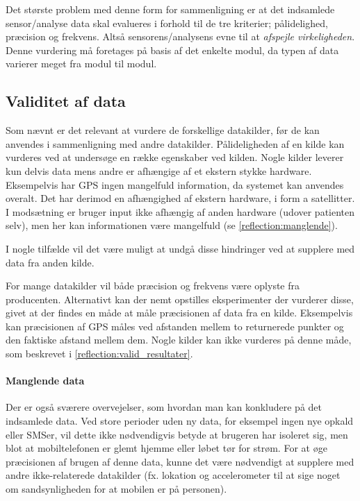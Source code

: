 Det største problem med denne form for sammenligning er at det indsamlede sensor/analyse data skal evalueres i forhold til de tre kriterier; pålidelighed, præcision og frekvens.
Altså sensorens/analysens evne til at \textit{afspejle virkeligheden}.
Denne vurdering må foretages på basis af det enkelte modul, da typen af data varierer meget fra modul til modul.

\subsection{Validitet af data}
Som nævnt er det relevant at vurdere de forskellige datakilder, før de kan anvendes i sammenligning med andre datakilder.
Pålideligheden af en kilde kan vurderes ved at undersøge en række egenskaber ved kilden.
Nogle kilder leverer kun delvis data mens andre er afhængige af et ekstern stykke hardware.
Eksempelvis har GPS ingen mangelfuld information, da systemet kan anvendes overalt.
Det har derimod en afhængighed af ekstern hardware, i form a satellitter.
I modsætning er bruger input ikke afhængig af anden hardware (udover patienten selv), men her kan informationen være mangelfuld (se \cref{reflection:manglende}).

I nogle tilfælde vil det være muligt at undgå disse hindringer ved at supplere med data fra anden kilde.

For mange datakilder vil både præcision og frekvens være oplyste fra producenten.
Alternativt kan der nemt opstilles eksperimenter der vurderer disse, givet at der findes en måde at måle præcisionen af data fra en kilde.
Eksempelvis kan præcisionen af GPS måles ved afstanden mellem to returnerede punkter og den faktiske afstand mellem dem.
Nogle kilder kan ikke vurderes på denne måde, som beskrevet i \cref{reflection:valid_resultater}.

\paragraph{Manglende data}
Der er også sværere overvejelser, som hvordan man kan konkludere på det indsamlede data.
Ved store perioder uden ny data, for eksempel ingen nye opkald eller SMSer, vil dette ikke nødvendigvis betyde at brugeren har isoleret sig, men blot at mobiltelefonen er glemt hjemme eller løbet tør for strøm.
For at øge præcisionen af brugen af denne data, kunne det være nødvendigt at supplere med andre ikke-relaterede datakilder (fx. lokation og accelerometer til at sige noget om sandsynligheden for at mobilen er på personen).

